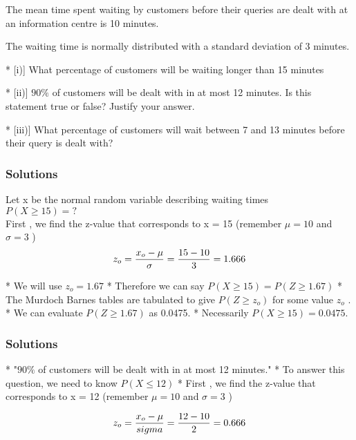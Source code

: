 \begin{frame}
The mean time spent waiting by customers before their queries are dealt with at an information centre is 10 minutes.

The waiting time is normally distributed with a standard deviation of 3 minutes.
\begin{itemize}
*  [i)] What percentage of customers will be waiting longer than 15 minutes

*  [ii)] $90\%$ of customers will be dealt with in at most 12 minutes. Is this statement true or false?
Justify your answer.

*  [iii)] What percentage of customers will wait between 7 and 13 minutes before their query is dealt with?
\end{itemize}
\end{frame}
\begin{frame}
\frametitle{Solutions}

Let x be the normal random variable describing waiting times\\
$P(X \geq 15) =?$ \\
\bigskip
     First , we find the z-value that corresponds to x = 15  (remember $\mu=10$ and $\sigma=3$  )\\
\[ z_o = { x_o - \mu \over \sigma }  = { 15 - 10 \over 3 } = 1.666 \]
\begin{itemize}
*  We will use $z_o =1.67$
*  Therefore we can say $P(X \geq 15 ) = P(Z \geq 1.67)$
*  The Murdoch Barnes tables are tabulated to give $P(Z \geq z_o)$ for some value $ z_o$ .
*  We can evaluate $P(Z \geq 1.67)$  as 0.0475.
*  Necessarily $P(X \geq 15) = 0.0475$.
\end{itemize}
\end{frame}

\begin{frame}
\frametitle{Solutions}
\begin{itemize}
*  "$90\%$ of customers will be dealt with in at most 12 minutes."
*  To answer this question, we need to know  $P(X\leq 12)$
*  First , we find the z-value that corresponds to x = 12  (remember $\mu=10$ and $\sigma=3$ )
\end{itemize}
\[ z_o = { x_o - \mu \over sigma }  = { 12 - 10 \over 2 } = 0.666 \]

\end{frame}

